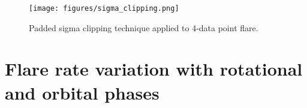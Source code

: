 \documentclass[fleqn,usenatbib,letters]{mnras}%
\begin{document}
\begin{figure}
\texttt{[image: figures/sigma\_clipping.png]} 
\caption{Padded sigma clipping technique applied to 4-data point flare.}
\label{fig:illustrate_clipping}
\end{figure}
\section{Flare rate variation with rotational and orbital phases}
\end{document}
